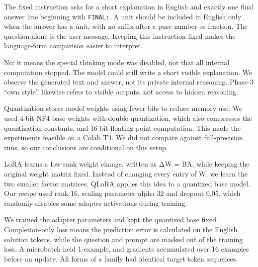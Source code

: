 \medskip{}\par\nopagebreak

The fixed instruction asks for a short explanation in English and exactly one final answer line beginning with \texttt{FINAL:}. A unit should be included in English only when the answer has a unit, with no suffix after a pure number or fraction. The question alone is the user message. Keeping this instruction fixed makes the language-form comparison easier to interpret.

\medskip{}\par\nopagebreak

No: it means the special thinking mode was disabled, not that all internal computation stopped. The model could still write a short visible explanation. We observe the generated text and answer, not its private internal reasoning. Phase-3 “own style” likewise refers to visible outputs, not access to hidden reasoning.

\medskip{}\par\nopagebreak

Quantization stores model weights using fewer bits to reduce memory use. We used 4-bit NF4 base weights with double quantization, which also compresses the quantization constants, and 16-bit floating-point computation. This made the experiments feasible on a Colab T4. We did not compare against full-precision runs, so our conclusions are conditional on this setup.

\medskip{}\par\nopagebreak

LoRA learns a low-rank weight change, written as ΔW = BA, while keeping the original weight matrix fixed. Instead of changing every entry of W, we learn the two smaller factor matrices. QLoRA applies this idea to a quantized base model. Our recipe used rank 16, scaling parameter alpha 32 and dropout 0.05, which randomly disables some adapter activations during training.

\medskip{}\par\nopagebreak

We trained the adapter parameters and kept the quantized base fixed. Completion-only loss means the prediction error is calculated on the English solution tokens, while the question and prompt are masked out of the training loss. A microbatch held 1 example, and gradients accumulated over 16 examples before an update. All forms of a family had identical target token sequences.

